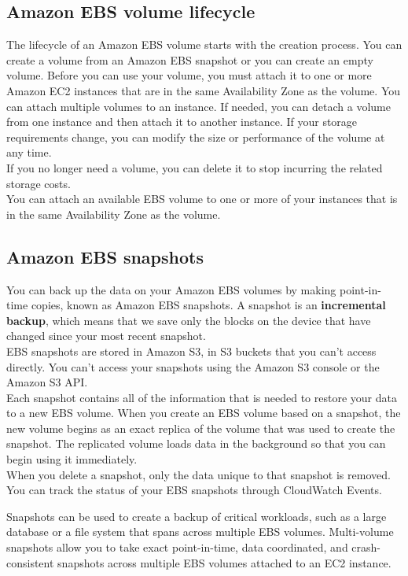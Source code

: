 \documentclass[12pt, letterpaper, twoside]{article}
\begin{document}
\subsection{Amazon EBS volume lifecycle}
The lifecycle of an Amazon EBS volume starts with the creation process. You can create a volume from an Amazon EBS snapshot or you can create 
an empty volume. Before you can use your volume, you must attach it to one or more Amazon EC2 instances that are in the same Availability Zone 
as the volume. You can attach multiple volumes to an instance. If needed, you can detach a volume from one instance and then attach it to another 
instance. If your storage requirements change, you can modify the size or performance of the volume at any time.\\
If you no longer need a volume, you can delete it to stop incurring the related storage costs.\\

You can attach an available EBS volume to one or more of your instances that is in the same Availability Zone as the volume.

\subsection{Amazon EBS snapshots}
You can back up the data on your Amazon EBS volumes by making point-in-time copies, known as Amazon EBS snapshots. A snapshot is an 
\textbf{incremental backup}, which means that we save only the blocks on the device that have changed since your most recent snapshot.\\

EBS snapshots are stored in Amazon S3, in S3 buckets that you can't access directly. You can't access your snapshots using the Amazon S3 
console or the Amazon S3 API.\\
Each snapshot contains all of the information that is needed to restore your data to a new EBS volume. When you create an EBS volume based on 
a snapshot, the new volume begins as an exact replica of the volume that was used to create the snapshot. The replicated volume loads data in 
the background so that you can begin using it immediately.\\
When you delete a snapshot, only the data unique to that snapshot is removed.\\

You can track the status of your EBS snapshots through CloudWatch Events.

Snapshots can be used to create a backup of critical workloads, such as a large database or a file system that spans across multiple EBS 
volumes. Multi-volume snapshots allow you to take exact point-in-time, data coordinated, and crash-consistent snapshots across multiple EBS 
volumes attached to an EC2 instance.\\
\end{document}

